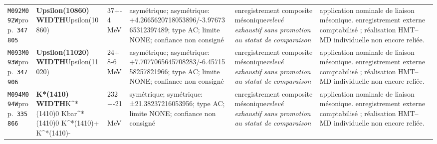 \begin{landscape}
\begin{longtable}{L{1.85cm}L{4.45cm}L{2.35cm}L{4.05cm}L{3.35cm}L{7.15cm}}
\texttt{M092}\newline \texttt{M092W}\newline prop.\ \texttt{347805} & \textbf{Upsilon(10860) WIDTH}\newline Upsilon(10860) & 37+-4\,MeV & asymétrique; asymétrique: +4.2665620718053896/-3.9767365312397489; type AC; limite NONE; confiance non consigné & enregistrement composite mésonique\newline \emph{relevé exhaustif sans promotion au statut de comparaison} & application nominale de liaison mésonique. enregistrement externe comptabilisé ; réalisation HMT--MD individuelle non encore reliée. \\
\texttt{M093}\newline \texttt{M093W}\newline prop.\ \texttt{347906} & \textbf{Upsilon(11020) WIDTH}\newline Upsilon(11020) & 24+8-6\,MeV & asymétrique; asymétrique: +7.7077065645708283/-6.4571558257821966; type AC; limite NONE; confiance non consigné & enregistrement composite mésonique\newline \emph{relevé exhaustif sans promotion au statut de comparaison} & application nominale de liaison mésonique. enregistrement externe comptabilisé ; réalisation HMT--MD individuelle non encore reliée. \\
\texttt{M094}\newline \texttt{M094W}\newline prop.\ \texttt{335866} & \textbf{K*(1410) WIDTH}\newline K\textasciicircum{}*(1410)0 \textbar{}\allowbreak{} Kbar\textasciicircum{}*(1410)0 \textbar{}\allowbreak{} K\textasciicircum{}*(1410)+ \textbar{}\allowbreak{} K\textasciicircum{}*(1410)- & 232+-21\,MeV & symétrique; symétrique: ±21.38237216053956; type AC; limite NONE; confiance non consigné & enregistrement composite mésonique\newline \emph{relevé exhaustif sans promotion au statut de comparaison} & application nominale de liaison mésonique. enregistrement externe comptabilisé ; réalisation HMT--MD individuelle non encore reliée. \\

\end{longtable}
\end{landscape}
